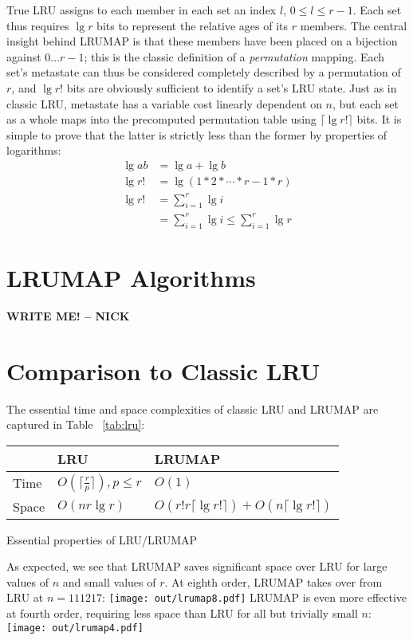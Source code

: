 \documentclass[letterpaper,10pt]{article}
\makeatletter
\newenvironment{tablehere}
{\def\@captype{table}}
{}
\newenvironment{figurehere}
{\def\@captype{figure}}
{}
\makeatother
\begin{document}
\begin{multicols}{2}
True LRU assigns to each member in each set an index $l$, $0\le{l}\le{r-1}$.
Each set thus requires $\lg{r}$ bits to represent the relative ages of its $r$
members. The central insight behind LRUMAP is that these members have been
placed on a bijection against $0\dotsc{r-1}$; this is the classic definition of
a \textit{permutation} mapping. Each set's metastate can thus be considered
completely described by a permutation of $r$, and $\lg{r!}$ bits are obviously
sufficient to identify a set's LRU state. Just as in classic LRU, metastate has
a variable cost linearly dependent on $n$, but each set as a whole maps into
the precomputed permutation table using $\lceil\lg{r!}\rceil$ bits. It is
simple to prove that the latter is strictly less than the former by properties
of logarithms:
\begin{align*}
\lg{ab} &= \lg{a} + \lg{b} \\
\lg{r!} &= \lg{(1*2*\dotsb*r-1*r)} \\
\lg{r!} &= \sum_{i=1}^{r}{\lg{i}} \\
&= \sum_{i=1}^{r}{\lg{i}} \le \sum_{i=1}^{r}{\lg{r}}
\end{align*}
\section{LRUMAP Algorithms}
\textbf{WRITE ME! -- NICK}
\section{Comparison to Classic LRU}
The essential time and space complexities of classic LRU and LRUMAP are
captured in Table ~\ref{tab:lru}:
\begin{center}
\begin{tablehere}
	\begin{tabular}{|l|l|l|}
	\hline
	& LRU & LRUMAP \\
	\hline
	Time & $O(\lceil\frac{r}{p}\rceil), {p}\le{r}$ & $O(1)$ \\
	\hline
	Space & $O(nr\lg{r})$ & $O(r!r\lceil\lg{r!}\rceil) + O(n\lceil\lg{r!}\rceil)$ \\
	\hline
	\end{tabular}
	\caption{Essential properties of LRU/LRUMAP}
	\label{tab:lru}
\end{tablehere}
\end{center}
As expected, we see that LRUMAP saves significant space over LRU for large
values of $n$ and small values of $r$. At eighth order, LRUMAP takes over
from LRU at $n=111217$:
\begin{figurehere}
	\centering
	\texttt{[image: out/lrumap8.pdf]}
\end{figurehere}
LRUMAP is even more effective at fourth order, requiring less space than LRU
for all but trivially small $n$:
\begin{figurehere}
	\centering
	\texttt{[image: out/lrumap4.pdf]}
\end{figurehere}

\end{multicols}
\end{document}
